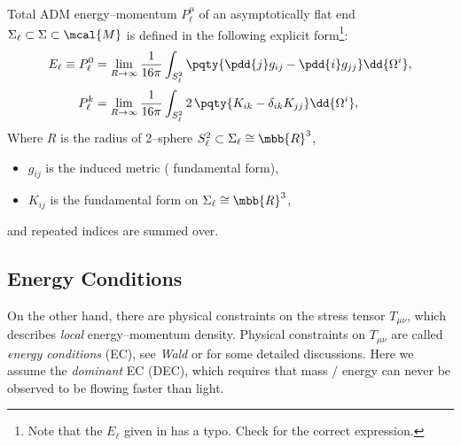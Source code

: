 \documentclass[a4paper,11pt]{article}
\begin{document}
	\begin{definition*}
		Total ADM energy--momentum $P^\mu_\ell$ of an asymptotically flat end $\Sigma_\ell \subset \Sigma \subset \mcal{M}$ is defined in the following explicit form\footnote{
			Note that the $E_\ell$ given in \cite{Parker:1981uy} has a typo. Check \cite{Witten:1981mf,Wald:1984rg} for the correct expression. 
		}:
		\begin{equation}
		\begin{aligned}
			E_\ell \equiv P^0_\ell
			&= \lim\limits_{R \to \infty}
				\frac{1}{16\pi} \int_{S^2_\ell}
				\pqty{
					\pdd{j} g_{ij}
					- \pdd{i} g_{jj}
				} \dd{\Omega^i},\\[.5ex]
			P^k_\ell
			&= \lim\limits_{R \to \infty}
				\frac{1}{16\pi} \int_{S^2_\ell}
				2\,\pqty{
					K_{ik} - \delta_{ik} K_{jj}
				} \dd{\Omega^i},
		\end{aligned}
		\label{eq:adm_energy}
		\end{equation}
		Where $R$ is the radius of 2--sphere $S^2_\ell \subset \Sigma_\ell \cong \mbb{R}^3$, 
		\begin{itemize}[noitemsep,topsep=.3\baselineskip]
		\item $g_{ij}$ is the induced metric ( fundamental form),
		\item $K_{ij}$ is the  fundamental form on $\Sigma_\ell \cong \mbb{R}^3$, 
		\end{itemize}
		and repeated indices are summed over. 
		\vspace*{1ex}
	\end{definition*}
\subsection{Energy Conditions}
	On the other hand, there are physical constraints on the stress tensor $T_{\mu\nu}$, which describes \textit{local} energy--momentum density. Physical constraints on $T_{\mu\nu}$ are called \textit{energy conditions} (EC), see \textit{Wald} \cite{Wald:1984rg} or \cite{Curiel:2014zba} for some detailed discussions. Here we assume the \textit{dominant} EC (DEC), which requires that mass / energy can never be observed to be flowing faster than light. 
	
\end{document}
